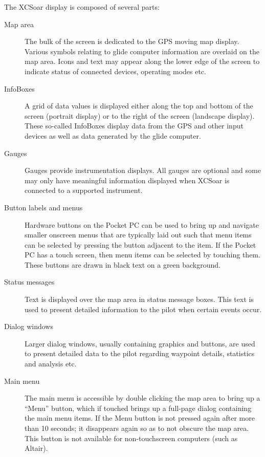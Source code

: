 \documentclass[a4paper,12pt]{refrep}
\newcommand{\InfoBox}[0]{{InfoBox}}
\begin{document}
The XCSoar display is composed of several parts:
\begin{description}
\item[Map area] The bulk of the screen is dedicated to the GPS moving 
 map display.  Various symbols relating to glide computer information
 are overlaid on the map area.  Icons and text may appear along the
 lower edge of the screen to indicate status of connected devices,
 operating modes etc.
\item[{\InfoBox}es] A grid of data values is displayed either along
  the top and bottom of the screen (portrait display) or to the right
  of the screen (landscape display).  These so-called {\InfoBox}es
  display data from the GPS and other input devices as well as data
  generated by the glide computer.
\item[Gauges]  Gauges provide instrumentation displays.
All gauges are optional and some may only have meaningful information
displayed when XCSoar is connected to a supported instrument.
\item[Button labels and menus] Hardware buttons on the Pocket PC
  can be used to bring up and navigate smaller onscreen menus that
  are typically laid out such that menu items can be selected by pressing
  the button adjacent to the item.  If the Pocket PC has a touch screen,
  then menu items can be selected by touching them.  These buttons
  are drawn in black text on a green background.
\item[Status messages]  Text is displayed over the map area in status
 message boxes.  This text is used to present detailed information to
 the pilot when certain events occur. 
\item[Dialog windows] Larger dialog windows, usually containing
  graphics and buttons, are used to present detailed data to the pilot
  regarding waypoint details, statistics and analysis etc. 
\item[Main menu] The main menu is accessible by double clicking the
  map area to bring up a ``Menu'' button, which if touched brings up a
  full-page dialog containing the main menu items.  If the Menu button
  is not pressed again after more than 10 seconds; it disappears again
  so as to not obscure the map area.  This button is not available for
  non-touchscreen computers (such as Altair).
\end{description}
\end{document}
